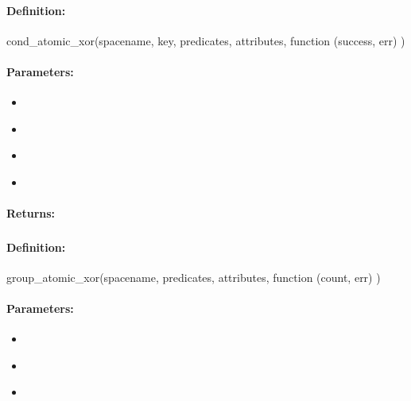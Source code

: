 \paragraph{Definition:}
\begin{javascriptcode}
cond_atomic_xor(spacename, key, predicates, attributes, function (success, err) {})
\end{javascriptcode}
\paragraph{Parameters:}
\begin{itemize}[noitemsep]
\item {}\\

\item {}\\

\item {}\\

\item {}\\

\end{itemize}

\paragraph{Returns:}


\pagebreak
\subsubsection{}
\label{api:nodejs:group_atomic_xor}


\paragraph{Definition:}
\begin{javascriptcode}
group_atomic_xor(spacename, predicates, attributes, function (count, err) {})
\end{javascriptcode}
\paragraph{Parameters:}
\begin{itemize}[noitemsep]
\item {}\\

\item {}\\

\item {}\\

\end{itemize}

